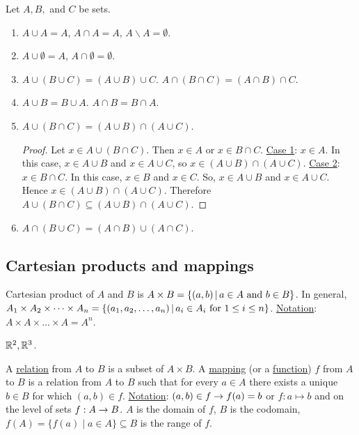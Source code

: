 \documentclass[]{article}
\begin{document}
\begin{proposition}
	Let $A,B,$ and $C$ be sets.
	\begin{enumerate}
		\item $A\cup A = A$, $A\cap A = A$, $A\backslash A = \emptyset $.
		\item $A\cup \emptyset = A$, $A\cap \emptyset = \emptyset$.
		\item $A\cup (B\cup C) = (A\cup B)\cup C$.
		$A\cap (B\cap C) = (A\cap B) \cap C$.
		\item $A\cup B = B\cup A$. $A\cap B = B\cap A$.
		\item $A\cup (B\cap C) = (A\cup B) \cap (A\cup C)$.
		\begin{proof}
			Let $x\in A\cup (B\cap C)$. Then $x\in A$ or $x\in B\cap C$. \ul{Case 1}: $x\in A$. In this case, $x\in A\cup B$ and $x\in A\cup C$, so $x\in (A\cup B)\cap (A\cup C)$. \ul{Case 2}: $x\in B\cap C$. In this case, $x \in B$ and $x\in C$. So, $x\in A\cup B$ and $x\in A\cup C$. Hence $x \in (A\cup B)\cap (A\cup C)$. Therefore $A\cup (B\cap C) \subseteq (A\cup B)\cap (A\cup C)$.
		\end{proof}
		\item $A\cap (B\cup C) = (A\cap B) \cup (A\cap C)$.
	\end{enumerate}
\end{proposition}

\subsection*{Cartesian products and mappings}

Cartesian product of $A$ and $B$ is $A\times B = \left\{ (a,b) \, \middle| \, a\in A \text{ and } b\in B \right\}$.
In general, $A_1\times A_2\times\dots\times A_n = \left\{ (a_1,a_2,\dots,a_n) \, \middle| \, a_i\in A_i \text{ for } 1\leq i \leq n \right\}$.
\ul{Notation}: $A\times A\times \dots\times A = A^n$.

\begin{example}
	$\mathbb{R}^2, \mathbb{R}^3$.
\end{example}

A \ul{relation} from $A$ to $B$ is a subset of $A\times B$.
A \ul{mapping} (or a \ul{function}) $f$ from $A$ to $B$ is a relation from $A$ to $B$ such that for every $a\in A$ there exists a unique $b\in B$ for which $(a,b)\in f$. \ul{Notation}: $(a,b) \in f \rightarrow f(a) = b$ or $f:a\mapsto b$ and on the level of sets $f:A\rightarrow B$. $A$ is the domain of $f$, $B$ is the codomain, $f(A) = \{f(a)\mid a\in A\}\subseteq B$ is the range of $f$.
\end{document}

